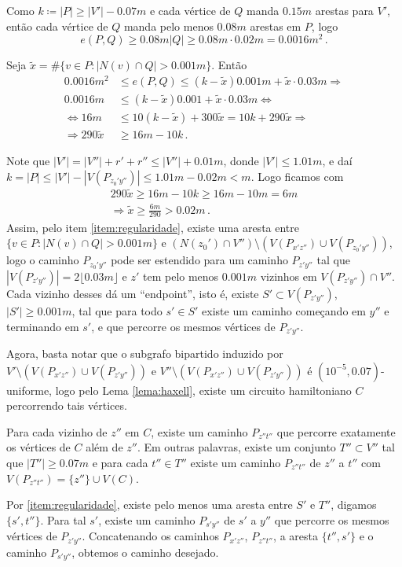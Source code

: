 \begin{dem}
	Como $k\coloneqq |P|\geq |V'| - 0.07m$ e cada vértice de $Q$ manda $0.15m$ arestas para $V'$, então cada vértice de $Q$ manda pelo menos $0.08m$ arestas em $P$, logo
	\[
		e(P,Q)\geq0.08m|Q|\geq0.08m\cdot0.02m = 0.0016m^2\,.
	\]
	
	Seja $\tilde{x} = \#\{v\in P: |N(v)\cap Q|>0.001m\}$. Então 
	\begin{align*}
		0.0016m^2&\leq  e(P,Q)\leq (k-\tilde{x})0.001m + \tilde{x}\cdot 0.03m\Longrightarrow \\
		0.0016m&\leq (k-\tilde{x})0.001 + \tilde{x}\cdot 0.03m\Longleftrightarrow \\
		\Longleftrightarrow 16m&\leq 10(k-\tilde{x}) + 300\tilde{x} = 10k + 290\tilde{x}\Longrightarrow \\
		\Longrightarrow 290\tilde{x}&\geq 16m - 10k\,.
	\end{align*}
	
	Note que $|V'| = |V''| + r' + r''\leq |V''| + 0.01m$, donde $|V'|\leq1.01m$, e daí $k = |P|\leq |V'| - |V(P_{z_0'y''})|\leq1.01m - 0.02m < m$. Logo ficamos com 
	\begin{gather*}
		290\tilde{x}\geq16m - 10k\geq16m - 10m = 6m \\
		\Longrightarrow \tilde{x}\geq \frac{6m}{290} > 0.02m\,.
	\end{gather*}
	Assim, pelo item \ref{item:regularidade}, existe uma aresta entre $\{v\in P: |N(v)\cap Q|>0.001m\}$ e $(N(z_0')\cap V'')\setminus(V(P_{x'z''})\cup V(P_{z_0'y''}))$, logo o caminho $P_{z_0'y''}$ pode ser estendido para um caminho $P_{z'y''}$ tal que $|V(P_{z'y''})| = 2\lfloor0.03m\rfloor$ e $z'$ tem pelo menos $0.001m$ vizinhos em $V(P_{z'y''})\cap V''$. Cada vizinho desses dá um ``endpoint'', isto é, existe $S'\subset V(P_{z'y''})$, $|S'|\geq0.001m$, tal que para todo $s'\in S'$ existe um caminho começando em $y''$ e terminando em $s'$, e que percorre os mesmos vértices de $P_{z'y''}$.
	
	Agora, basta notar que o subgrafo bipartido induzido por $V'\setminus(V(P_{x'z''})\cup V(P_{z'y''}))$ e $V''\setminus(V(P_{x'z''})\cup V(P_{z'y''}))$ é $(10^{-5}, 0.07)$-uniforme, logo pelo Lema \ref{lema:haxell}, existe um circuito hamiltoniano $C$ percorrendo tais vértices.
	
	Para cada vizinho de $z''$ em $C$, existe um caminho $P_{z''t''}$ que percorre exatamente os vértices de $C$ além de $z''$. Em outras palavras, existe um conjunto $T''\subset V''$ tal que $|T''|\geq0.07m$ e para cada $t''\in T''$ existe um caminho $P_{z''t''}$ de $z''$ a $t''$ com $V(P_{z''t''}) = \{z''\}\cup V(C)$.
	
	Por \ref{item:regularidade}, existe pelo menos uma aresta entre $S'$ e $T''$, digamos $\{s', t''\}$. Para tal $s'$, existe um caminho $P_{s'y''}$ de $s'$ a $y''$ que percorre os mesmos vértices de $P_{z'y''}$. Concatenando os caminhos $P_{x'z''}$, $P_{z''t''}$, a aresta $\{t'', s'\}$ e o caminho $P_{s'y''}$, obtemos o caminho desejado.
	\qedhere
\end{dem}

